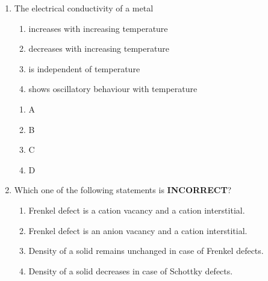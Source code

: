 \documentclass[journal,12pt,onecolumn]{exam}
\theoremstyle{remark}
\newcommand{\correct}{\textcolor{correctgreen}{\checkmark}}
\newcommand{\wrong}{\textcolor{wrongred}{\ding{55}}} %
\begin{document}
\begin{enumerate}
\hfill{}

 

\begin{multicols}{2}
\begin{enumerate}
    \item \wrong A
    \item \wrong B
    \item \wrong C
    \item \correct D
\end{enumerate}
\end{multicols}

 

\item 
The electrical conductivity of a metal

\begin{enumerate}
    \item increases with increasing temperature
    \item decreases with increasing temperature
    \item is independent of temperature
    \item shows oscillatory behaviour with temperature
\end{enumerate}

\hfill{}

 

\begin{multicols}{2}
\begin{enumerate}
    \item \wrong A
    \item \correct B
    \item \wrong C
    \item \wrong D
\end{enumerate}
\end{multicols}

 

\item 
Which one of the following statements is \textbf{INCORRECT}?

\begin{enumerate}
    \item Frenkel defect is a cation vacancy and a cation interstitial.
    \item Frenkel defect is an anion vacancy and a cation interstitial.
    \item Density of a solid remains unchanged in case of Frenkel defects.
    \item Density of a solid decreases in case of Schottky defects.
\end{enumerate}


\end{enumerate}
\end{document}
